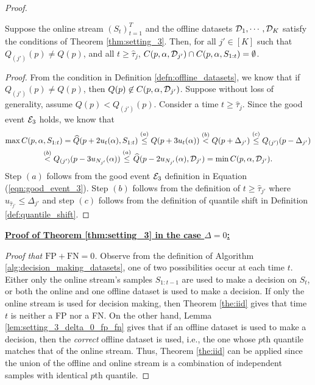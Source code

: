 \begin{proof}
{%

\begin{lemma}
    Suppose the online stream $(S_t)_{t =1}^T$ and the offline datasets ${\mathcal{D}}_1, \cdots, {\mathcal{D}}_K$ satisfy the conditions of Theorem \ref{thm:setting_3}. Then, for all $j' \in [K]$ such that $Q_{(j')}(p) \neq Q(p)$, and all $t \geq \widehat{\tau}_j$, $C(p,\alpha, {\mathcal{D}}_{j'}) \cap C(p,\alpha,S_{1:t}) = \emptyset$.
        \label{lem:setting_3_structural}
\end{lemma}
\begin{proof}
    From the condition in Definition \ref{defn:offline_datasets}, we know that if $Q_{(j')}(p) \neq Q(p)$, then $Q(p) \not \in C(p,\alpha, {\mathcal{D}}_{j'})$. Suppose without loss of generality, assume $Q(p) < Q_{(j')}(p)$. Consider a time $t \geq \widehat{\tau}_j$. Since the good event ${\mathcal{E}}_3$ holds, we know that 
    \begin{multline*}
        \max C(p,\alpha,S_{1:t}) = \widehat{Q}(p + 2u_t(\alpha), S_{1:t}) \stackrel{(a)}{\leq} Q(p+3u_t(\alpha)) \stackrel{(b)}{<} Q(p + \Delta_{j'}) \stackrel{(c)}{\leq} Q_{(j')}(p-\Delta_{j'}) \\ \stackrel{(b)}{<} Q_{(j')}(p-3u_{N_{j'}}(\alpha)) \stackrel{(a)}{\leq} \widehat{Q}(p-2u_{N_{j'}}(\alpha), {\mathcal{D}}_{j'}) = \min C(p,\alpha, {\mathcal{D}}_{j'}).
    \end{multline*}
    Step $(a)$ follows from the good event ${\mathcal{E}}_3$ definition in Equation (\ref{eqn:good_event_3}). Step $(b)$ follows from the definition of $t \geq \widehat{\tau}_{j'}$ where $u_{\widehat{\tau}_{j'}} \leq \Delta_{j'}$ and step $(c)$ follows from the definition of quantile shift in Definition \ref{def:quantile_shift}.
\end{proof}


\textbf{\underline{Proof of Theorem \ref{thm:setting_3} in the case $\Delta = 0$:}} 


    \textit{Proof that $\text{FP} + \text{FN} = 0$.} Observe from the definition of Algorithm \ref{alg:decision_making_datasets}, one of two possibilities occur at each time $t$. Either only the online stream's samples $S_{1:t-1}$ are used to make a decision on $S_t$, or both the online and one offline dataset is used to make a decision. If only the online stream is used for decision making, then Theorem \ref{the:iid} gives that time $t$ is neither a FP nor a FN. On the other hand, Lemma \ref{lem:setting_3_delta_0_fp_fn} gives that if an offline dataset is used to make a decision, then the \emph{correct} offline dataset is used, i.e., the one whose $p$th quantile matches that of the online stream. Thus, Theorem \ref{the:iid} can be applied since the union of the offline and online stream is a combination of independent samples with identical $p$th quantile. 

}
\end{proof}
